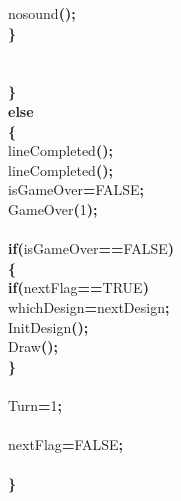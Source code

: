 \documentclass[a4paper, 10pt]{article}
\newcommand\SPC{\hspace*{0.6em}}
\newcommand\TAB{\hspace*{1.2em}}
\newcommand{\CppAIdentifier}[1]{#1}
\newcommand{\CppANumber}[1]{\textcolor[rgb]{0.5,0,0.5}{#1}}
\newcommand{\CppAReservedWord}[1]{\textbf{#1}}
\newcommand{\CppASpace}[1]{\colorbox[rgb]{1,1,1}{#1}}
\newcommand{\CppASymbol}[1]{\textbf{\textcolor[rgb]{1,0,0}{#1}}}
\begin{document}
\begin{ttfamily}
\CppASpace{\SPC \SPC \SPC \SPC }\CppAIdentifier{nosound}\CppASymbol{(}\CppASymbol{)}\CppASymbol{;}\\
\CppASpace{\SPC \SPC \SPC }\CppASymbol{\}}\\
\\
\\
\CppASpace{\SPC \SPC }\CppASymbol{\}}\\
\CppASpace{\SPC \SPC }\CppAReservedWord{else}\\
\CppASpace{\SPC \SPC }\CppASymbol{\{}\\
\CppASpace{\SPC \SPC \SPC }\CppAIdentifier{lineCompleted}\CppASymbol{(}\CppASymbol{)}\CppASymbol{;}\\
\CppASpace{\SPC \SPC \SPC }\CppAIdentifier{lineCompleted}\CppASymbol{(}\CppASymbol{)}\CppASymbol{;}\\
\CppASpace{\SPC \SPC \SPC }\CppAIdentifier{isGameOver}\CppASymbol{=}\CppAIdentifier{FALSE}\CppASymbol{;}\\
\CppASpace{\SPC \SPC \SPC }\CppAIdentifier{GameOver}\CppASymbol{(}\CppANumber{1}\CppASymbol{)}\CppASymbol{;}\\
\\
\CppASpace{\TAB \SPC \SPC \SPC \SPC }\CppAReservedWord{if}\CppASymbol{(}\CppAIdentifier{isGameOver}\CppASymbol{==}\CppAIdentifier{FALSE}\CppASymbol{)}\\
\CppASpace{\SPC \SPC \SPC }\CppASymbol{\{}\\
\CppASpace{\SPC \SPC \SPC \SPC }\CppAReservedWord{if}\CppASymbol{(}\CppAIdentifier{nextFlag}\CppASymbol{==}\CppAIdentifier{TRUE}\CppASymbol{)}\\
\CppASpace{\SPC \SPC \SPC \SPC }\CppAIdentifier{whichDesign}\CppASymbol{=}\CppAIdentifier{nextDesign}\CppASymbol{;}\\
\CppASpace{\SPC \SPC \SPC \SPC }\CppAIdentifier{InitDesign}\CppASymbol{(}\CppASymbol{)}\CppASymbol{;}\\
\CppASpace{\SPC \SPC \SPC \SPC }\CppAIdentifier{Draw}\CppASymbol{(}\CppASymbol{)}\CppASymbol{;}\\
\CppASpace{\SPC \SPC \SPC }\CppASymbol{\}}\\
\\
\CppASpace{\SPC \SPC \SPC }\CppAIdentifier{Turn}\CppASymbol{=}\CppANumber{1}\CppASymbol{;}\\
\\
\CppASpace{\SPC \SPC \SPC }\CppAIdentifier{nextFlag}\CppASymbol{=}\CppAIdentifier{FALSE}\CppASymbol{;}\\
\\
\CppASpace{\SPC \SPC }\CppASymbol{\}}\\

\end{ttfamily}
\end{document}

